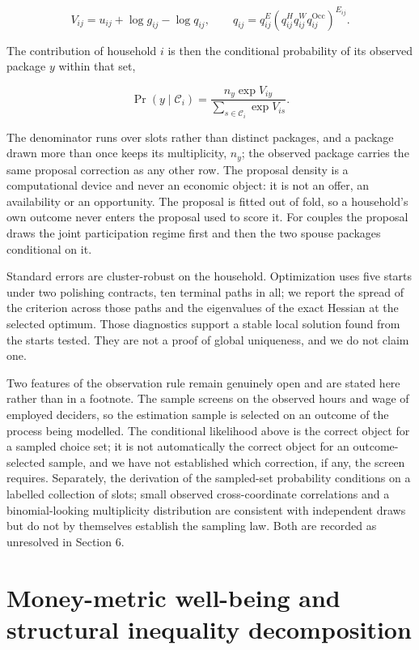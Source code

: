 \documentclass[11pt,a4paper]{article}
\begin{document}
\[
V_{ij}=u_{ij}+\log g_{ij}-\log q_{ij},
\qquad
q_{ij}=q^{E}_{ij}\left(q^{H}_{ij}q^{W}_{ij}q^{\mathrm{Occ}}_{ij}\right)^{E_{ij}} .
\]

The contribution of household \(i\) is then the conditional probability of its observed package \(y\) within that set,

\[
\Pr\!\left(y\mid\mathcal C_i\right)=
\frac{n_{y}\exp V_{iy}}{\sum_{s\in\mathcal C_i}\exp V_{is}} .
\]

The denominator runs over slots rather than distinct packages, and a package drawn more than once keeps its multiplicity, \(n_y\); the observed package carries the same proposal correction as any other row. The proposal density is a computational device and never an economic object: it is not an offer, an availability or an opportunity. The proposal is fitted out of fold, so a household's own outcome never enters the proposal used to score it. For couples the proposal draws the joint participation regime first and then the two spouse packages conditional on it.

Standard errors are cluster-robust on the household. Optimization uses five starts under two polishing contracts, ten terminal paths in all; we report the spread of the criterion across those paths and the eigenvalues of the exact Hessian at the selected optimum. Those diagnostics support a stable local solution found from the starts tested. They are not a proof of global uniqueness, and we do not claim one.

Two features of the observation rule remain genuinely open and are stated here rather than in a footnote. The sample screens on the observed hours and wage of employed deciders, so the estimation sample is selected on an outcome of the process being modelled. The conditional likelihood above is the correct object for a sampled choice set; it is not automatically the correct object for an outcome-selected sample, and we have not established which correction, if any, the screen requires. Separately, the derivation of the sampled-set probability conditions on a labelled collection of slots; small observed cross-coordinate correlations and a binomial-looking multiplicity distribution are consistent with independent draws but do not by themselves establish the sampling law. Both are recorded as unresolved in Section 6.

\section{Money-metric well-being and structural inequality decomposition}\label{money-metric-well-being-and-structural-inequality-decomposition}
\end{document}
